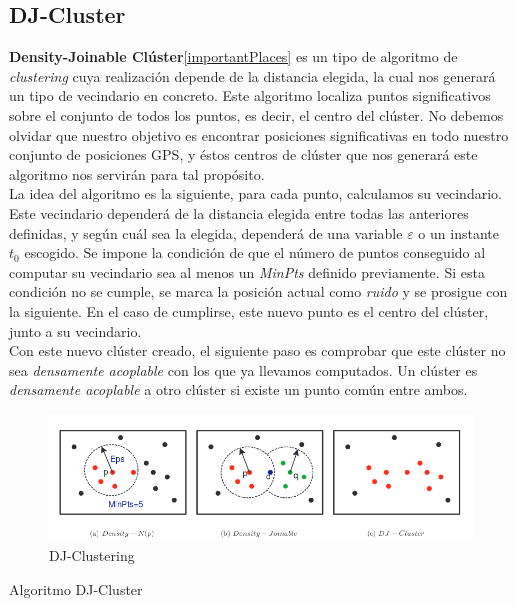 \documentclass[a4paper, 12pt]{article}
\begin{document}
\pagebreak
\subsection{DJ-Cluster}

\textbf{Density-Joinable Cl\'uster}\ref{importantPlaces} es un tipo de algoritmo de \textit{clustering} cuya realizaci\'on depende de la distancia elegida, la cual nos generar\'a un tipo de vecindario en concreto. Este algoritmo localiza puntos significativos sobre el conjunto de todos los puntos, es decir, el centro del cl\'uster. No debemos olvidar que nuestro objetivo es encontrar posiciones significativas en todo nuestro conjunto de posiciones GPS, y \'estos centros de cl\'uster que nos generar\'a este algoritmo nos servir\'an para tal prop\'osito. \\

La idea del algoritmo es la siguiente, para cada punto, calculamos su vecindario. Este vecindario depender\'a de la distancia elegida entre todas las anteriores definidas, y seg\'un cu\'al sea la elegida, depender\'a de una variable $\varepsilon$ o un instante $t_0$ escogido. Se impone la condici\'on de que el n\'umero de puntos conseguido al computar su vecindario sea al menos un \textit{MinPts} definido previamente. Si esta condici\'on no se cumple, se marca la posici\'on actual como \textit{ruido} y se prosigue con la siguiente. En el caso de cumplirse, este nuevo punto es el centro del cl\'uster, junto a su vecindario.  \\

Con este nuevo cl\'uster creado, el siguiente paso es comprobar que este cl\'uster no sea \textit{densamente acoplable} con los que ya llevamos computados. Un cl\'uster es \textit{densamente acoplable} a otro cl\'uster si existe un punto com\'un entre ambos. \\

\begin{figure}[!htbp]
\centering
	\includegraphics[scale=.7]{djcluster.png}
\caption{DJ-Clustering}
\end{figure}

\begin{algorithm}[!htbp]\label{djCluster}
\begin{algorithmic}[1]
		\Else
		\EndIf
	\EndFor
\end{algorithmic}
\caption{\label{alg:djcluster} Algoritmo DJ-Cluster}
\end{algorithm}
\end{document}
